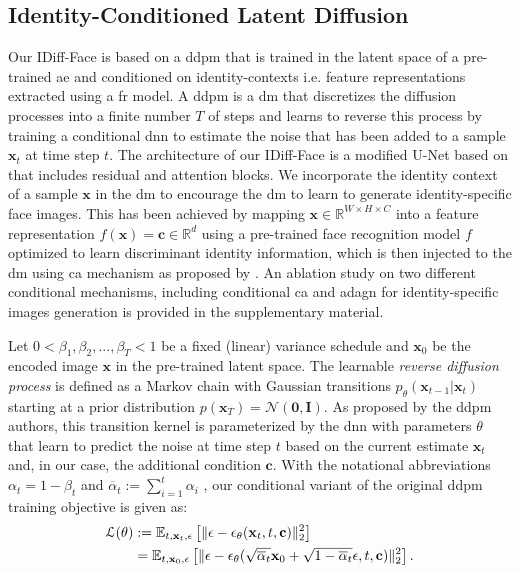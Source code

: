 \documentclass[10pt,twocolumn,letterpaper]{article}
\newcommand{\approachname}{IDiff-Face }
\DeclarePairedDelimiter{\norm}{\lVert}{\rVert}
\begin{document}
\subsection{Identity-Conditioned Latent Diffusion}
\vspace{-1mm}
Our \approachname is based on a \acrshort{ddpm} that is trained in the latent space of a pre-trained \acrshort{ae} \cite{Rombach2021} and conditioned on identity-contexts i.e. feature representations extracted using a \acrshort{fr} model.
A \acrshort{ddpm} \cite{Ho2020} is a \acrshort{dm} that discretizes the diffusion processes into a finite number $T$ of steps and learns to reverse this process by training a conditional \acrshort{dnn} to estimate the noise that has been added to a sample $\mathbf{x}_t$ at time step $t$. The architecture of our \approachname is a modified U-Net \cite{Ronneberger2015} based on \cite{Ho2020} that includes residual and attention blocks.
We incorporate the identity context of a sample $\mathbf{x}$ in the \acrshort{dm} to encourage the \acrshort{dm} to learn to generate identity-specific face images. 
This has been achieved by mapping $\mathbf{x} \in \mathbb{R}^{W\times H\times C}$ into a feature representation $f(\mathbf{x}) = \mathbf{c} \in \mathbb{R}^{d}$ using a pre-trained face recognition model $f$ optimized to learn discriminant identity information, which is then injected to the \acrshort{dm} using \acrshort{ca} mechanism as proposed by \cite{Rombach2021}. An ablation study on two different conditional mechanisms, including conditional \acrshort{ca} \cite{Rombach2021} and \acrfull{adagn} \cite{Dhariwal2021} for identity-specific images generation is provided in the supplementary material.

Let $0<\beta_1,\beta_2,...,\beta_T<1$ be a fixed (linear) variance schedule and $\mathbf{x}_0$ be the encoded image $\mathbf{x}$ in the pre-trained latent space. The learnable \textit{reverse diffusion process} is defined as a Markov chain with Gaussian transitions $p_\theta(\mathbf{x}_{t-1}|\mathbf{x}_t)$ starting at a prior distribution $p(\mathbf{x}_T)=\mathcal{N}(\mathbf{0,I})$. As proposed by the \acrshort{ddpm} authors, this transition kernel is parameterized by the \acrshort{dnn} with parameters $\theta$ that learn to predict the noise at time step $t$ based on the current estimate $\mathbf{x}_t$ and, in our case, the additional condition $\mathbf{c}$. With the notational abbreviations $\alpha_t = 1-\beta_t$ and $\overline{\alpha}_t := \sum_{i=1}^t \alpha_i$ \cite{Ho2020}, our conditional variant of the original \acrshort{ddpm} training objective is given as:
\vspace{-1mm}
\begin{align*}
\small
    \mathcal{L}(\theta) &:= \mathbb{E}_{t,\mathbf{x}_t, \boldmath{\epsilon}} \left [\norm{\boldmath{\epsilon} - \boldmath{\epsilon}_\theta(\mathbf{x}_t,t,\mathbf{c})}^2_2\right ]\\
    &= \mathbb{E}_{t,\mathbf{x}_0, \boldmath{\epsilon}} \left [ \norm{\boldmath{\epsilon} - \boldmath{\epsilon}_\theta ( \sqrt{\overline{\alpha}_t}\mathbf{x}_0 + \sqrt{1-\overline{\alpha}_t} \boldmath{\epsilon}, t,\mathbf{c})  }^2_2 \right].
\end{align*}
\end{document}
